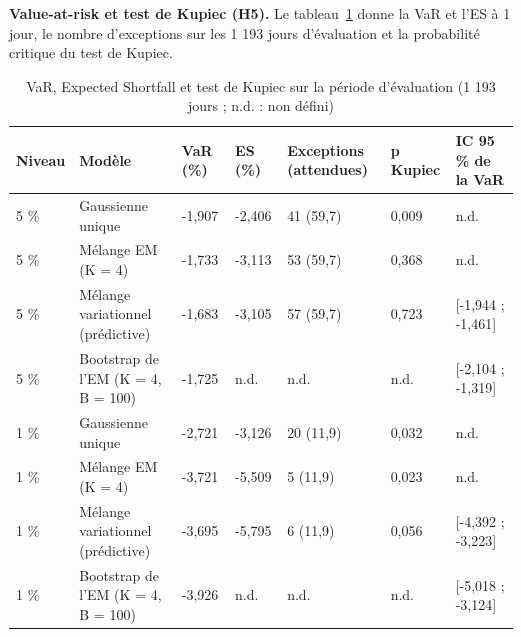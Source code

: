 \textbf{Value-at-risk et test de Kupiec (H5). }Le tableau~\ref{tab:3_cas_var} donne la VaR et l'ES à 1 jour, le nombre d'exceptions sur les 1 193 jours d'évaluation et la probabilité critique du test de Kupiec.

\begin{table}[H]
\centering
\small
\setlength{\tabcolsep}{0.07cm}
\footnotesize
\begin{tabular}{|p{1.2cm}|p{3.9cm}|p{1.3cm}|p{1.3cm}|p{1.9cm}|p{1.3cm}|p{2.6cm}|}
\hline
\textbf{Niveau} & \textbf{Modèle} & \textbf{VaR (\%)} & \textbf{ES (\%)} & \textbf{Exceptions (attendues)} & \textbf{p Kupiec} & \textbf{IC 95 \% de la VaR} \\
\hline
5 \% & Gaussienne unique & -1,907 & -2,406 & 41 (59,7) & 0,009 & n.d. \\
\hline
5 \% & Mélange EM (K = 4) & -1,733 & -3,113 & 53 (59,7) & 0,368 & n.d. \\
\hline
5 \% & Mélange variationnel (prédictive) & -1,683 & -3,105 & 57 (59,7) & 0,723 & [-1,944 ; -1,461] \\
\hline
5 \% & Bootstrap de l'EM (K = 4, B = 100) & -1,725 & n.d. & n.d. & n.d. & [-2,104 ; -1,319] \\
\hline
1 \% & Gaussienne unique & -2,721 & -3,126 & 20 (11,9) & 0,032 & n.d. \\
\hline
1 \% & Mélange EM (K = 4) & -3,721 & -5,509 & 5 (11,9) & 0,023 & n.d. \\
\hline
1 \% & Mélange variationnel (prédictive) & -3,695 & -5,795 & 6 (11,9) & 0,056 & [-4,392 ; -3,223] \\
\hline
1 \% & Bootstrap de l'EM (K = 4, B = 100) & -3,926 & n.d. & n.d. & n.d. & [-5,018 ; -3,124] \\
\hline
\end{tabular}
\caption{VaR, Expected Shortfall et test de Kupiec sur la période d'évaluation (1 193 jours ; n.d. : non défini)}
\label{tab:3_cas_var}
\end{table}
